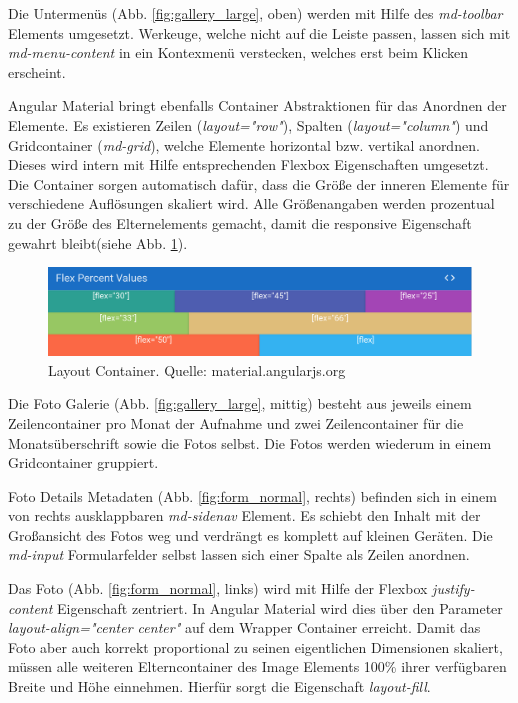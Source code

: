 Die Untermenüs (Abb. \ref{fig:gallery_large}, oben) werden mit Hilfe des \textit{md-toolbar} Elements umgesetzt. Werkeuge, welche nicht auf die Leiste passen, lassen sich mit \textit{md-menu-content} in ein Kontexmenü verstecken, welches erst beim Klicken erscheint.

Angular Material bringt ebenfalls Container Abstraktionen für das Anordnen der Elemente. Es existieren Zeilen (\textit{layout="row"}), Spalten (\textit{layout="column"}) und Gridcontainer (\textit{md-grid}), welche Elemente horizontal bzw. vertikal anordnen. Dieses wird intern  mit Hilfe entsprechenden Flexbox Eigenschaften umgesetzt. Die Container sorgen automatisch dafür, dass die Größe der inneren Elemente für verschiedene Auflösungen skaliert wird. Alle Größenangaben werden prozentual zu der Größe des Elternelements gemacht, damit die responsive Eigenschaft gewahrt bleibt(siehe Abb. \ref{fig:layout_container}). 

\begin{figure}[htp]     %
\centering
\includegraphics[width=1.0\textwidth]{images/layout_container} 
\caption{Layout Container. Quelle: material.angularjs.org}\label{fig:layout_container}
\end{figure}

Die Foto Galerie (Abb. \ref{fig:gallery_large}, mittig) besteht aus jeweils einem Zeilencontainer pro Monat der Aufnahme und zwei Zeilencontainer für die Monatsüberschrift sowie die Fotos selbst. Die Fotos werden wiederum in einem Gridcontainer gruppiert. 

Foto Details Metadaten (Abb. \ref{fig:form_normal}, rechts) befinden sich in einem von rechts ausklappbaren \textit{md-sidenav} Element. Es schiebt den Inhalt mit der Großansicht des Fotos weg und verdrängt es komplett auf kleinen Geräten. Die \textit{md-input} Formularfelder selbst lassen sich einer Spalte als Zeilen anordnen.

Das Foto (Abb. \ref{fig:form_normal}, links) wird mit Hilfe der Flexbox \textit{justify-content} Eigenschaft zentriert. In Angular Material wird dies über den Parameter \textit{layout-align="center center"} auf dem Wrapper Container erreicht. Damit das Foto aber auch korrekt proportional zu seinen eigentlichen Dimensionen skaliert, müssen alle weiteren Elterncontainer des Image Elements 100\% ihrer verfügbaren Breite und Höhe einnehmen. Hierfür sorgt die Eigenschaft \textit{layout-fill}.

